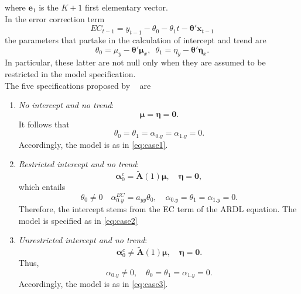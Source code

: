 where $\mathbf{e}_{1}$ is the $K+1$ first elementary vector.\\
In the error correction term 
\begin{equation}
EC_{t-1}=y_{t-1}-\theta_{0}-\theta_{1}t-\boldsymbol{\theta}'\mathbf{x}_{t-1}
\end{equation}
the parameters that partake in the calculation of intercept and trend are
\begin{equation}
\theta_{0}=\mu_{y}-\boldsymbol{\theta}'\boldsymbol{\mu}_{x}, \enspace  \theta_{1}=\eta_{y}-\boldsymbol{\theta}'\boldsymbol{\eta}_{x}.
\end{equation}
In particular, these latter are not null only when they are assumed to be restricted in the model specification.\\
The five specifications proposed by ~\citet{pesaran2001} are
\begin{enumerate}[I]
\item \textit{No intercept and no trend}:
\begin{equation}
\boldsymbol{\mu}=\boldsymbol{\eta}=\mathbf{0}. 
\end{equation}
It follows that
\begin{equation}
\theta_{0}=\theta_{1}=\alpha_{0.y}=\alpha_{1.y}=0.
\end{equation}
Accordingly, the model is as in \eqref{eq:case1}.

\item \textit{Restricted intercept and no trend}:
\begin{equation}
\boldsymbol{\alpha}_{0}^{c}= \widetilde{\mathbf{A}}(1)\boldsymbol{\mu},\enspace \enspace  \boldsymbol{\eta}=\mathbf{0},
\end{equation}
which entails
\begin{equation}
\theta_0 \neq 0 \enspace\enspace\alpha_{0.y}^{EC}=a_{yy}\theta_{0}, \enspace \enspace
\alpha_{0.y}=\theta_{1}=\alpha_{1.y}=0.
\end{equation}
Therefore, the intercept stems from the EC term of the ARDL equation. The model is specified as in \eqref{eq:case2}

\item \textit{Unrestricted intercept and no trend}:
\begin{equation}
\boldsymbol{\alpha}_{0}^{c}\neq\widetilde{\mathbf{A}}(1)\boldsymbol{\mu}, \enspace \enspace \boldsymbol{\eta}=\mathbf{0}.
\end{equation}
Thus,
\begin{equation}
\alpha_{0.y}\neq 0,\enspace \enspace \theta_{0}=\theta_{1}=\alpha_{1.y}=0.
\end{equation}
Accordingly, the model is as in \eqref{eq:case3}.


\end{enumerate}
